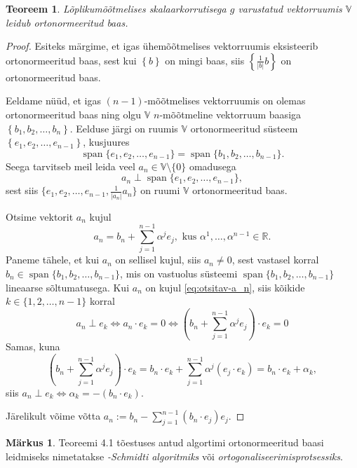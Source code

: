 \documentclass[12pt]{article}
\theoremstyle{plain}
\newtheorem{teoreem}{Teoreem}[section]
\theoremstyle{definition}
\newtheorem{markus}{Märkus}[section]
\numberwithin{equation}{section}
\def\R{{\mathbb R}}
\def\V{{\mathbb V}}
\DeclareMathOperator{\spn}{span}
\begin{document}
\begin{teoreem} \textnormal{\cite[teoreem II.7.3]{FA2}}
Lõplikumõõtmelises skalaarkorrutisega $g$ varustatud vektorruumis 
$\V$ leidub ortonormeeritud baas.
\end{teoreem}
\begin{proof}
Esiteks märgime, et igas ühemõõtmelises vektorruumis eksisteerib 
ortonormeeritud baas, sest kui $\left\lbrace b \right\rbrace$ on 
mingi baas, siis $\left\lbrace \frac{1}{|b|} b\right\rbrace$ on 
ortonormeeritud baas.

Eeldame nüüd, et igas $(n-1)$-mõõtmelises vektorruumis on olemas 
ortonormeeritud baas ning olgu $\V$ $n$-mõõtmeline 
vektorruum baasiga $\left\lbrace b_1, b_2, \dots, b_n \right\rbrace$. 
Eelduse järgi on ruumis $\V$ ortonormeeritud süsteem 
$\left\lbrace e_1, e_2, \dots, e_{n-1} \right\rbrace$, kusjuures
\[ \spn\{ e_1, e_2, \dots, e_{n-1}\} = 
\spn\{ b_1, b_2, \dots, b_{n-1}\}. \]
Seega tarvitseb meil leida veel $a_n \in \V \setminus \{0\}$ 
omadusega
\[a_n \perp \spn\{ e_1, e_2, \dots, e_{n-1}\},\]
sest siis $\{ e_1, e_2, \dots, e_{n-1}, \frac{1}{|a_n|}a_n\}$ on 
ruumi $\V$ ortonormeeritud baas.

Otsime vektorit $a_n$ kujul
\begin{equation} \label{eq:otsitav-a_n}
a_n = b_n + \sum_{j = 1}^{n-1} \alpha^j e_j, 
\text{ kus } \alpha^1, \dots, \alpha^{n-1} \in \R.
\end{equation}
Paneme tähele, et kui $a_n$ on sellisel kujul, siis $a_n \neq 0$, 
sest vastasel korral $b_n \in \spn\{ b_1, b_2, \dots, b_{n-1}\}$, 
mis on vastuolus süsteemi $\spn\{ b_1, b_2, \dots, b_{n-1}\}$ 
lineaarse sõltumatusega.
Kui $a_n$ on kujul \ref{eq:otsitav-a_n}, siis kõikide 
$k \in \{1, 2, \dots, n-1\}$ korral
\begin{equation*}
a_n \perp e_k \iff a_n \cdot e_k = 0 \iff 
\left(b_n + \sum_{j = 1}^{n-1} \alpha^j e_j\right) \cdot e_k = 0
\end{equation*}
Samas, kuna
\begin{equation*}
\left(b_n + \sum_{j = 1}^{n-1} \alpha^j e_j\right) \cdot e_k = 
b_n \cdot e_k + \sum_{j = 1}^{n-1} 
\alpha^j \left(e_j \cdot e_k \right) 
= b_n \cdot e_k + \alpha_k,
\end{equation*}
siis $a_n \perp e_k \iff \alpha_k = - \left(b_n \cdot e_k \right)$. 

Järelikult võime võtta 
$a_n := b_n - \sum_{j=1}^{n-1}\left(b_n \cdot e_j\right)e_j$.
\end{proof}

\begin{markus} \label{markus:gram-schmidt}
Teoreemi 4.1 tõestuses antud algortimi ortonormeeritud baasi 
leidmiseks nimetatakse \emph{-Schmidti algoritmiks} või 
\emph{ortogonaliseerimisprotsessiks}.
\end{markus}
\end{document}
